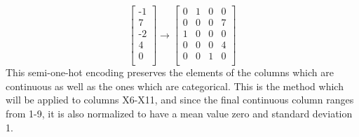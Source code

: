             \begin{equation}
                \begin{bmatrix}
                \text{-1}\\
                \text{7}\\
                \text{-2}\\
                \text{4}\\
                \text{0}\\
                \end{bmatrix}
                \rightarrow
                \begin{bmatrix}
                0 & 1 & 0 & 0\\
                0 & 0 & 0 & 7\\
                1 & 0 & 0 & 0\\
                0 & 0 & 0 & 4\\
                0 & 0 & 1 & 0\\
                \end{bmatrix}
            \end{equation}
            This semi-one-hot encoding preserves the elements of the columns which are continuous as well as the ones which are categorical. This is the method which will be applied to columns X6-X11, and since the final continuous column ranges from 1-9, it is also normalized to have a mean value zero and standard deviation 1. 
        
